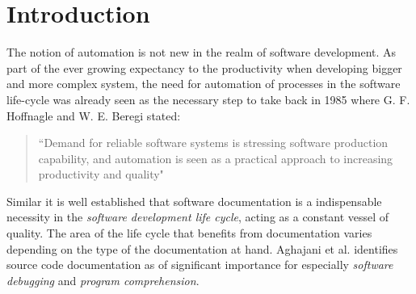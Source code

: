 \section{Introduction}
\label{sec:intro}
The notion of automation is not new in the realm of software development. As part of the ever growing expectancy to the productivity when developing bigger and more complex system, the need for automation of processes in the software life-cycle was already seen as the necessary step to take back in 1985 where G. F. Hoffnagle and W. E. Beregi stated:
\begin{quote}
    ``Demand for reliable software systems is stressing software production capability, and automation is seen as a practical approach to increasing productivity and quality"\cite{5387726}
\end{quote}

Similar it is well established that software documentation is a indispensable necessity in the \textit{software development life cycle}, acting as a constant vessel of quality. The area of the life cycle that benefits from documentation varies depending on the type of the documentation at hand. Aghajani et al.\cite{aghajani2020software} identifies source code documentation as of significant importance for especially \textit{software debugging} and \textit{program comprehension}.


